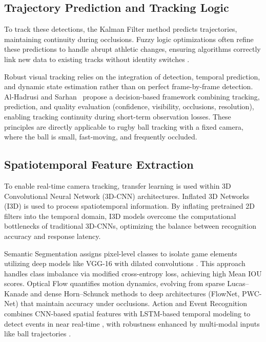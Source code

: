 \documentclass[conference]{IEEEtran}
\begin{document}
\subsection{Trajectory Prediction and Tracking Logic}
To track these detections, the Kalman Filter method predicts trajectories, maintaining continuity during occlusions. Fuzzy logic optimizations often refine these predictions to handle abrupt athletic changes, ensuring algorithms correctly link new data to existing tracks without identity switches \cite{yousefi_tracking_2023}.

Robust visual tracking relies on the integration of detection, temporal prediction, and dynamic state estimation rather than on perfect frame-by-frame detection. Al-Hadrusi and Sarhan~\cite{AlHadrusi2012PTZ} propose a decision-based framework combining tracking, prediction, and quality evaluation (confidence, visibility, occlusions, resolution), enabling tracking continuity during short-term observation losses. These principles are directly applicable to rugby ball tracking with a fixed camera, where the ball is small, fast-moving, and frequently occluded.

\subsection{Spatiotemporal Feature Extraction}
To enable real-time camera tracking, transfer learning is used within 3D Convolutional Neural Network (3D-CNN) architectures. Inflated 3D Networks (I3D) \cite{xie_rethinking_2018} is used to process spatiotemporal information. By inflating pretrained 2D filters into the temporal domain, I3D models overcome the computational bottlenecks of traditional 3D-CNNs, optimizing the balance between recognition accuracy and response latency.

Semantic Segmentation assigns pixel-level classes to isolate game elements utilizing deep models like VGG-16 with dilated convolutions \cite{li_research_2024, xie_rethinking_2018}. This approach handles class imbalance via modified cross-entropy loss, achieving high Mean IOU scores. Optical Flow quantifies motion dynamics, evolving from sparse Lucas–Kanade and dense Horn–Schunck methods \cite{opencv_optical_flow_tutorial, scaler_motion_estimation_optical_flow_2025, viso_optical_flow_2024} to deep architectures (FlowNet, PWC-Net) that maintain accuracy under occlusions. Action and Event Recognition combines CNN-based spatial features with LSTM-based temporal modeling to detect events in near real-time \cite{poms_scanner_2018, xu_yolo-based_2025}, with robustness enhanced by multi-modal inputs like ball trajectories \cite{wu_multi-camera_2020, zhang_multi-camera_2020}.
\end{document}
